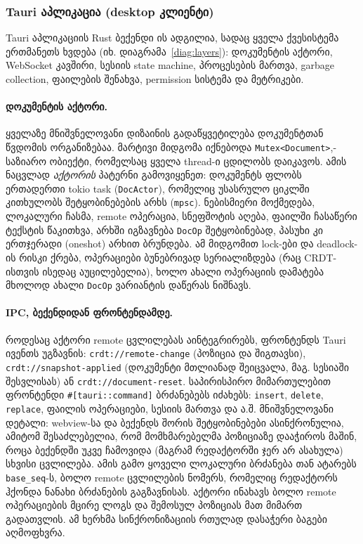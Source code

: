 \subsubsection{Tauri აპლიკაცია (desktop კლიენტი)}

Tauri აპლიკაციის Rust ბექენდი ის ადგილია, სადაც ყველა ქვესისტემა
ერთმანეთს ხვდება (იხ. დიაგრამა~\ref{diag:layers}): დოკუმენტის აქტორი,
WebSocket კავშირი, სესიის state machine, პროცესების მართვა, garbage
collection, ფაილების შენახვა, permission სისტემა და მეტრიკები.

\paragraph{დოკუმენტის აქტორი.}
ყველაზე მნიშვნელოვანი დიზაინის გადაწყვეტილება დოკუმენტთან წვდომის
ორგანიზებაა. მარტივი მიდგომა იქნებოდა \texttt{Mutex<Document>},-
საზიარო ობიექტი, რომელსაც ყველა thread-ი ცდილობს დაიკავოს. ამის ნაცვლად
\emph{აქტორის} პატერნი გამოვიყენეთ: დოკუმენტს ფლობს ერთადერთი tokio
task (\texttt{DocActor}), რომელიც უსასრულო ციკლში კითხულობს
შეტყობინებების არხს (\texttt{mpsc}). ნებისმიერი მოქმედება, ლოკალური
ჩასმა, remote ოპერაცია, სნეფშოტის აღება, ფაილში ჩასაწერი ტექსტის
წაკითხვა, არხში იგზავნება \texttt{DocOp} შეტყობინებად, პასუხი კი
ერთჯერადი (oneshot) არხით ბრუნდება. ამ მიდგომით lock-ები და deadlock-ის
რისკი ქრება, ოპერაციები ბუნებრივად სერიალიზდება (რაც CRDT-ისთვის ისედაც
აუცილებელია), ხოლო ახალი ოპერაციის დამატება მხოლოდ ახალი \texttt{DocOp}
ვარიანტის დაწერას ნიშნავს.

\paragraph{IPC, ბექენდიდან ფრონტენდამდე.}
როდესაც აქტორი remote ცვლილებას აინტეგრირებს, ფრონტენდს Tauri ივენთს
უგზავნის: \texttt{crdt://remote-change} (პოზიცია და შიგთავსი),
\texttt{crdt://snapshot-applied} (დოკუმენტი მთლიანად შეიცვალა, მაგ.
სესიაში შესვლისას) ან \texttt{crdt://document-reset}. საპირისპირო
მიმართულებით ფრონტენდი \texttt{\#[tauri::command]} ბრძანებებს იძახებს:
\texttt{insert}, \texttt{delete}, \texttt{replace}, ფაილის ოპერაციები,
სესიის მართვა და ა.შ. მნიშვნელოვანი დეტალი: webview-სა და ბექენდს შორის
შეტყობინებები ასინქრონულია, ამიტომ შესაძლებელია, რომ მომხმარებელმა
პოზიციაზე დააჭიროს მაშინ, როცა ბექენდში უკვე ჩამოვიდა (მაგრამ რედაქტორში
ჯერ არ ასახულა) სხვისი ცვლილება. ამის გამო ყოველი ლოკალური ბრძანება თან
ატარებს \texttt{base\_seq}-ს, ბოლო remote ცვლილების ნომერს, რომელიც
რედაქტორს ჰქონდა ნანახი ბრძანების გაგზავნისას. აქტორი ინახავს ბოლო
remote ოპერაციების მცირე ლოგს და შემოსულ პოზიციას მათ მიმართ
გადათვლის. ამ ხერხმა სინქრონიზაციის რთულად დასაჭერი ბაგები აღმოფხვრა.


